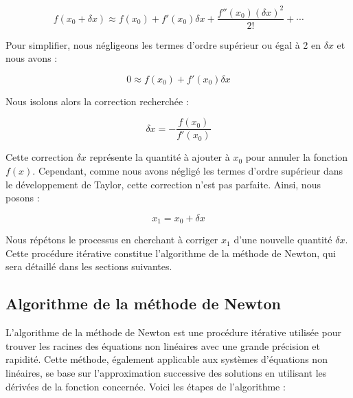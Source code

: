 \documentclass{article}
\begin{document}
\[
f(x_0 + \delta x) \approx f(x_0) + f'(x_0) \delta x + \frac{f''(x_0)(\delta x)^2}{2!} + \cdots
\]

Pour simplifier, nous négligeons les termes d'ordre supérieur ou égal à 2 en \(\delta x\) et nous avons :

\[
0 \approx f(x_0) + f'(x_0) \delta x
\]

Nous isolons alors la correction recherchée :

\[
\delta x = -\frac{f(x_0)}{f'(x_0)}
\]

Cette correction \(\delta x\) représente la quantité à ajouter à \( x_0 \) pour annuler la fonction \( f(x) \). Cependant, comme nous avons négligé les termes d'ordre supérieur dans le développement de Taylor, cette correction n'est pas parfaite. Ainsi, nous posons :

\[
x_1 = x_0 + \delta x
\]

Nous répétons le processus en cherchant à corriger \( x_1 \) d'une nouvelle quantité \(\delta x\). Cette procédure itérative constitue l'algorithme de la méthode de Newton, qui sera détaillé dans les sections suivantes.

\subsection{Algorithme de la méthode de Newton}
L'algorithme de la méthode de Newton est une procédure itérative utilisée pour trouver les racines des équations non linéaires avec une grande précision et rapidité. Cette méthode, également applicable aux systèmes d'équations non linéaires, se base sur l'approximation successive des solutions en utilisant les dérivées de la fonction concernée. Voici les étapes de l'algorithme :
\end{document}
